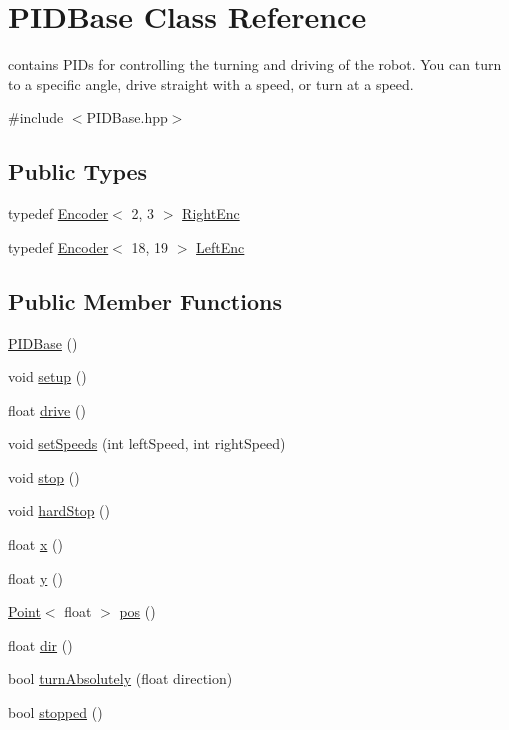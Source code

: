 \hypertarget{classPIDBase}{\section{P\-I\-D\-Base Class Reference}
\label{classPIDBase}
}


contains P\-I\-Ds for controlling the turning and driving of the robot. You can turn to a specific angle, drive straight with a speed, or turn at a speed.  




{\ttfamily \#include $<$P\-I\-D\-Base.\-hpp$>$}

\subsection*{Public Types}
\begin{DoxyCompactItemize}
\item 
typedef \hyperlink{classEncoder}{Encoder}$<$ 2, 3 $>$ \hyperlink{classPIDBase_ac5805fb7b51c9e4fedaab034d268464a}{Right\-Enc}
\item 
typedef \hyperlink{classEncoder}{Encoder}$<$ 18, 19 $>$ \hyperlink{classPIDBase_a7f9720adebb7763418d066d4fc4f8e25}{Left\-Enc}
\end{DoxyCompactItemize}
\subsection*{Public Member Functions}
\begin{DoxyCompactItemize}
\item 
\hyperlink{classPIDBase_a3d1adc8f47087f795979fb5596ea3e7d}{P\-I\-D\-Base} ()
\item 
void \hyperlink{classPIDBase_a326fb682c5a801ed57a98418db7702a4}{setup} ()
\item 
float \hyperlink{classPIDBase_ab7cfca91244b4177752dcc0fbf8d6f4d}{drive} ()
\item 
void \hyperlink{classPIDBase_ab078b6c0e03b48efc73def33eb1b03e2}{set\-Speeds} (int left\-Speed, int right\-Speed)
\item 
void \hyperlink{classPIDBase_adf5a06686538194d39659ddadc78def6}{stop} ()
\item 
void \hyperlink{classPIDBase_aa010fa26cf28d05554efe0a0ce4fa74d}{hard\-Stop} ()
\item 
float \hyperlink{classPIDBase_adcec556fd426590a5b05054614344b89}{x} ()
\item 
float \hyperlink{classPIDBase_a9557526e6f2048616cb84ccf65cfe235}{y} ()
\item 
\hyperlink{classPoint}{Point}$<$ float $>$ \hyperlink{classPIDBase_aaaa94fd117259cec77f6127244b36d6a}{pos} ()
\item 
float \hyperlink{classPIDBase_abde01e16704fe190c8eff5bb9bb5f2ae}{dir} ()
\item 
bool \hyperlink{classPIDBase_a92c97e24856e2812e0b6d027ab99ee63}{turn\-Absolutely} (float direction)
\item 
bool \hyperlink{classPIDBase_ad577132b4c9a2b0d26dc0a94e950efbc}{stopped} ()
\end{DoxyCompactItemize}
